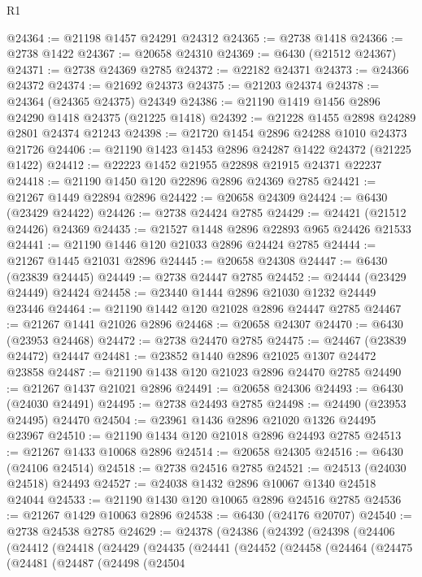 \begin{lexlean}{R1}
\begin{coremodule}
@24364 := @21198 @1457 @24291 @24312
@24365 := @2738 @1418
@24366 := @2738 @1422
@24367 := @20658 @24310
@24369 := @6430 (@21512 @24367)
@24371 := @2738 @24369 @2785
@24372 := @22182 @24371
@24373 := @24366 @24372
@24374 := @21692 @24373
@24375 := @21203 @24374
@24378 := @24364 (@24365 @24375) @24349
@24386 := @21190 @1419 @1456 @2896 @24290 @1418 @24375 (@21225 @1418)
@24392 := @21228 @1455 @2898 @24289 @2801 @24374 @21243
@24398 := @21720 @1454 @2896 @24288 @1010 @24373 @21726
@24406 := @21190 @1423 @1453 @2896 @24287 @1422 @24372 (@21225 @1422)
@24412 := @22223 @1452 @21955 @22898 @21915 @24371 @22237
@24418 := @21190 @1450 @120 @22896 @2896 @24369 @2785
@24421 := @21267 @1449 @22894 @2896
@24422 := @20658 @24309
@24424 := @6430 (@23429 @24422)
@24426 := @2738 @24424 @2785
@24429 := @24421 (@21512 @24426) @24369
@24435 := @21527 @1448 @2896 @22893 @965 @24426 @21533
@24441 := @21190 @1446 @120 @21033 @2896 @24424 @2785
@24444 := @21267 @1445 @21031 @2896
@24445 := @20658 @24308
@24447 := @6430 (@23839 @24445)
@24449 := @2738 @24447 @2785
@24452 := @24444 (@23429 @24449) @24424
@24458 := @23440 @1444 @2896 @21030 @1232 @24449 @23446
@24464 := @21190 @1442 @120 @21028 @2896 @24447 @2785
@24467 := @21267 @1441 @21026 @2896
@24468 := @20658 @24307
@24470 := @6430 (@23953 @24468)
@24472 := @2738 @24470 @2785
@24475 := @24467 (@23839 @24472) @24447
@24481 := @23852 @1440 @2896 @21025 @1307 @24472 @23858
@24487 := @21190 @1438 @120 @21023 @2896 @24470 @2785
@24490 := @21267 @1437 @21021 @2896
@24491 := @20658 @24306
@24493 := @6430 (@24030 @24491)
@24495 := @2738 @24493 @2785
@24498 := @24490 (@23953 @24495) @24470
@24504 := @23961 @1436 @2896 @21020 @1326 @24495 @23967
@24510 := @21190 @1434 @120 @21018 @2896 @24493 @2785
@24513 := @21267 @1433 @10068 @2896
@24514 := @20658 @24305
@24516 := @6430 (@24106 @24514)
@24518 := @2738 @24516 @2785
@24521 := @24513 (@24030 @24518) @24493
@24527 := @24038 @1432 @2896 @10067 @1340 @24518 @24044
@24533 := @21190 @1430 @120 @10065 @2896 @24516 @2785
@24536 := @21267 @1429 @10063 @2896
@24538 := @6430 (@24176 @20707)
@24540 := @2738 @24538 @2785
@24629 := @24378
    (@24386
      (@24392
        (@24398
          (@24406
            (@24412
              (@24418
                (@24429
                  (@24435
                    (@24441
                      (@24452
                        (@24458
                          (@24464
                            (@24475
                              (@24481
                                (@24487
                                  (@24498
                                    (@24504

\end{coremodule}
\end{lexlean}
